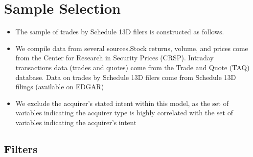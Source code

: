 \documentclass[12pt]{article}
\begin{document}
\section{Sample Selection}

    \begin{itemize}
        
        \item The sample of trades by Schedule 13D filers is constructed as follows.\citep{Collin-Dufresne2015}

        \item We compile data from several sources.Stock returns, volume, and prices come from the Center for Research in Security Prices (CRSP). Intraday transactions data (trades and quotes) come from the Trade and Quote (TAQ) database. Data on trades by Schedule 13D filers come from Schedule 13D filings (available on EDGAR) \citep{Collin-Dufresne2015}

        \item We exclude the acquirer’s stated intent within this model, as the set of variables indicating the acquirer type is highly correlated with the set of variables indicating the acquirer’s intent \citep{Brigida2012}

    \end{itemize}

\subsection{Filters}
\end{document}
